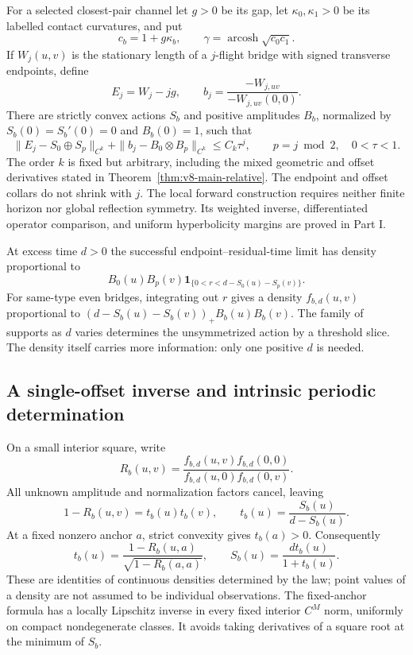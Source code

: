 For a selected closest-pair channel let \(g>0\) be its gap, let
\(\kappa_0,\kappa_1>0\) be its labelled contact curvatures, and put
\[
 c_b=1+g\kappa_b,\qquad
 \gamma=\operatorname{arcosh}\sqrt{c_0c_1}.
\]
If \(W_j(u,v)\) is the stationary length of a \(j\)-flight bridge with
signed transverse endpoints, define
\[
 E_j=W_j-jg,\qquad
 b_j=\frac{-W_{j,uv}}{-W_{j,uv}(0,0)}.
\]
There are strictly convex actions \(S_b\) and positive amplitudes \(B_b\),
normalized by \(S_b(0)=S_b'(0)=0\) and \(B_b(0)=1\), such that
\begin{equation}\label{eq:v25-intro-relative}
 \|E_j-S_0\oplus S_p\|_{C^k}
 +\|b_j-B_0\otimes B_p\|_{C^k}\le C_k\tau^j,
 \qquad p=j\bmod2,\quad 0<\tau<1.
\end{equation}
The order \(k\) is fixed but arbitrary, including the mixed geometric and
offset derivatives stated in Theorem~\ref{thm:v8-main-relative}.  The
endpoint and offset collars do not shrink with \(j\).  The local forward
construction requires neither finite horizon nor global reflection
symmetry.  Its weighted inverse, differentiated operator comparison, and
uniform hyperbolicity margins are proved in Part I.

At excess time \(d>0\) the successful endpoint--residual-time limit has
density proportional to
\[
 B_0(u)B_p(v)\mathbf1_{\{0<r<d-S_0(u)-S_p(v)\}}.
\]
For same-type even bridges, integrating out \(r\) gives a density
\(f_{b,d}(u,v)\) proportional to
\((d-S_b(u)-S_b(v))_+B_b(u)B_b(v)\).
The family of supports as \(d\) varies determines the unsymmetrized
action by a threshold slice.  The density itself carries more information:
only one positive \(d\) is needed.

\subsection{A single-offset inverse and intrinsic periodic determination}

On a small interior square, write
\[
 R_b(u,v)=\frac{f_{b,d}(u,v)f_{b,d}(0,0)}
                  {f_{b,d}(u,0)f_{b,d}(0,v)}.
\]
All unknown amplitude and normalization factors cancel, leaving
\begin{equation}\label{eq:v26-intro-ratio}
 1-R_b(u,v)=t_b(u)t_b(v),\qquad
 t_b(u)=\frac{S_b(u)}{d-S_b(u)}.
\end{equation}
At a fixed nonzero anchor \(a\), strict convexity gives
\(t_b(a)>0\).  Consequently
\[
 t_b(u)=\frac{1-R_b(u,a)}{\sqrt{1-R_b(a,a)}},\qquad
 S_b(u)=\frac{dt_b(u)}{1+t_b(u)}.
\]
These are identities of continuous densities determined by the law; point
values of a density are not assumed to be individual observations.  The
fixed-anchor formula has a locally Lipschitz inverse in every fixed
interior \(C^M\) norm, uniformly on compact nondegenerate classes.  It
avoids taking derivatives of a square root at the minimum of \(S_b\).

